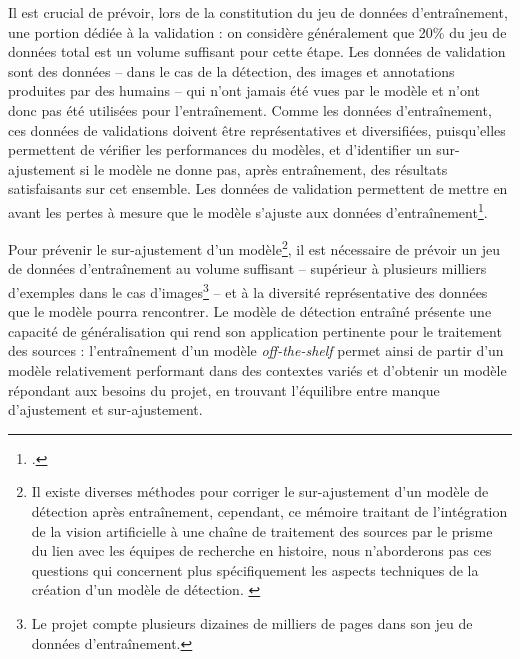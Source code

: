 		Il est crucial de prévoir, lors de la constitution du jeu de données d'entraînement, une portion dédiée à la validation : on considère généralement que 20\% du jeu de données total est un volume suffisant pour cette étape. Les données de validation sont des données -- dans le cas de la détection, des images et annotations produites par des humains -- qui n'ont jamais été vues par le modèle et n'ont donc pas été utilisées pour l'entraînement. Comme les données d'entraînement, ces données de validations doivent être représentatives et diversifiées, puisqu'elles permettent de vérifier les performances du modèles, et d'identifier un sur-ajustement si le modèle ne donne pas, après entraînement, des résultats satisfaisants sur cet ensemble. Les données de validation permettent de mettre en avant les pertes à mesure que le modèle s'ajuste aux données d'entraînement\footcite{carremansHandlingOverfittingDeep2019}.
		
		Pour prévenir le sur-ajustement d'un modèle\footnote{Il existe diverses méthodes pour corriger le sur-ajustement d'un modèle de détection après entraînement, cependant, ce mémoire traitant de l'intégration de la vision artificielle à une chaîne de traitement des sources par le prisme du lien avec les équipes de recherche en histoire, nous n'aborderons pas ces questions qui concernent plus spécifiquement les aspects techniques de la création d'un modèle de détection. \cite{carremansHandlingOverfittingDeep2019}}, il est nécessaire de prévoir un jeu de données d'entraînement au volume suffisant -- supérieur à plusieurs milliers d'exemples dans le cas d'images\footnote{Le projet \eida compte plusieurs dizaines de milliers de pages dans son jeu de données d'entraînement.} -- et à la diversité représentative des données que le modèle pourra rencontrer. Le modèle de détection entraîné présente une capacité de généralisation qui rend son application pertinente pour le traitement des sources : l'entraînement d'un modèle \textit{off-the-shelf} permet ainsi de partir d'un modèle relativement performant dans des contextes variés et d'obtenir un modèle répondant aux besoins du projet, en trouvant l'équilibre entre manque d'ajustement et sur-ajustement.
